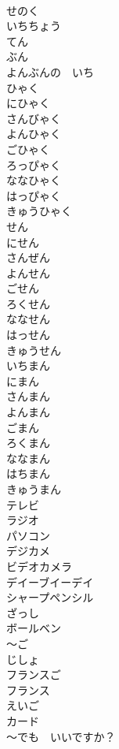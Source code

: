 \documentclass[8pt]{extreport}
\begin{document}
\begin{CJK}{UTF8}{min}
\\	せのく		
\\	いちちょう		
\\	てん		
\\	ぶん	
\\	よんぶんの　いち　
\\	ひゃく		
\\	にひゃく		
\\	さんびゃく		
\\	よんひゃく		
\\	ごひゃく		
\\	ろっぴゃく		
\\	ななひゃく		
\\	はっぴゃく		
\\	きゅうひゃく		
\\	せん		
\\	にせん		
\\	さんぜん		
\\	よんせん		
\\	ごせん		
\\	ろくせん		
\\	ななせん		
\\	はっせん		
\\	きゅうせん		
\\	いちまん		
\\	にまん		
\\	さんまん		
\\	よんまん		
\\	ごまん		
\\	ろくまん		
\\	ななまん		
\\	はちまん		
\\	きゅうまん		
\\	テレビ		
\\	ラジオ		
\\	パソコン		
\\	デジカメ		
\\	ビデオカメラ		
\\	デイーブイーデイ		
\\	シャープペンシル		
\\	ざっし		
\\	ボールベン		
\\	〜ご		
\\	じしょ		
\\	フランスご		
\\	フランス		
\\	えいご		
\\	カード		
\\	〜でも　いいですか？		

\end{CJK}
\end{document}
